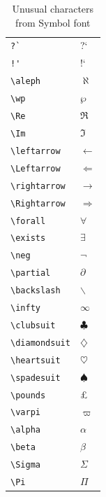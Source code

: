 ﻿\documentclass{article}
\begin{document}
\begin{table}
\begin{center}
\begin{tabular}{ll}
\verb#?`# & ?` \\
\verb#!'# & !` \\
\verb#\aleph# & $\aleph$\\
\verb#\wp# & $\wp$\\
\verb#\Re# & $\Re$\\
\verb#\Im# & $\Im$\\
\verb#\leftarrow# & $\leftarrow$\\
\verb#\Leftarrow# & $\Leftarrow$\\
\verb#\rightarrow# & $\rightarrow$\\
\verb#\Rightarrow# & $\Rightarrow$\\
\verb#\forall# & $\forall$\\
\verb#\exists# & $\exists$\\
\verb#\neg# & $\neg$\\
\verb#\partial# & $\partial$\\
\verb#\backslash# & $\backslash$\\
\verb#\infty# & $\infty$\\
\verb#\clubsuit# & $\clubsuit$\\
\verb#\diamondsuit# & $\diamondsuit$\\
\verb#\heartsuit# & $\heartsuit$\\
\verb#\spadesuit# & $\spadesuit$\\
\verb#\pounds# & \pounds\\
\verb#\varpi# & $\varpi$\\
\verb#\alpha# & $\alpha$\\
\verb#\beta# & $\beta$\\
\verb#\Sigma# & $\Sigma$\\
\verb#\Pi# & $\Pi$
\end{tabular}
\caption{Unusual characters from Symbol font}
\end{center}
\end{table}
\end{document}
